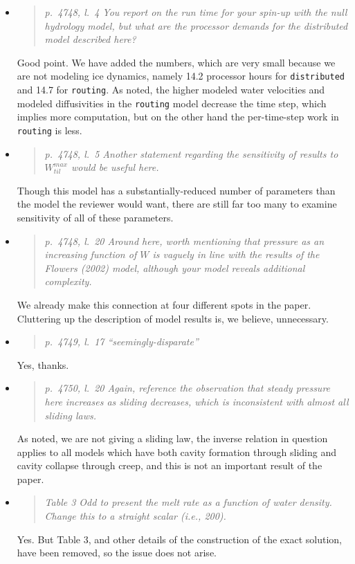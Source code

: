 \documentclass[11pt,reqno]{amsart}
\newcommand{\reply}[2]{
\medskip\medskip
\item  \begin{quote}
\emph{#1}
\end{quote}

\medskip
\noindent #2}
\begin{document}
\begin{itemize}
\reply{p.~4748, l.~4 You report on the run time for your spin-up with the null hydrology model, but what are the processor demands for the distributed model described here?}
{Good point.  We have added the numbers, which are very small because we are not modeling ice dynamics, namely 14.2 processor hours for \texttt{distributed} and 14.7 for \texttt{routing}.  As noted, the higher modeled water velocities and modeled diffusivities in the \texttt{routing} model decrease the time step, which implies more computation, but on the other hand the per-time-step work in \texttt{routing} is less.}

\reply{p.~4748, l.~5 Another statement regarding the sensitivity of results to $W_{til}^{max}$ would be useful here.}
{Though this model has a substantially-reduced number of parameters than the model the reviewer would want, there are still far too many to examine sensitivity of all of these parameters.}

\reply{p.~4748, l.~20 Around here, worth mentioning that pressure as an increasing function of $W$ is vaguely in line with the results of the Flowers (2002) model, although your model reveals additional complexity.}
{We already make this connection at four different spots in the paper.  Cluttering up the description of model results is, we believe, unnecessary.}

\reply{p.~4749, l.~17 ``seemingly-disparate''}
{Yes, thanks.}

\reply{p.~4750, l.~20 Again, reference the observation that steady pressure here increases as sliding decreases, which is inconsistent with almost all sliding laws.}
{As noted, we are not giving a sliding law, the inverse relation in question applies to all models which have both cavity formation through sliding and cavity collapse through creep, and this is not an important result of the paper.}

\reply{Table 3 Odd to present the melt rate as a function of water density. Change this to a
straight scalar (i.e., 200).}
{Yes.  But Table 3, and other details of the construction of the exact solution, have been removed, so the issue does not arise.}
\end{itemize}
\end{document}
